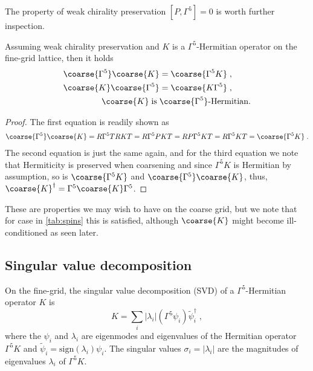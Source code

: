 The property of weak chirality preservation $[P, \Gamma^{5}]=0$ is worth further inspection.

\begin{lemma} \label{lemma:chirality:preservation:implications}
Assuming weak chirality preservation and $K$ is a $\Gamma^{5}$-Hermitian operator on the fine-grid lattice, then it holds
\begin{align}
\coarse{\Gamma^{5}} \coarse{K} &= \coarse{\Gamma^{5} K} \;, \\
\coarse{K} \coarse{\Gamma^{5}} &= \coarse{K \Gamma^{5}} \;, \\
\coarse{K} \; \text{is} \; &\coarse{\Gamma^{5}} \text{-Hermitian.}
\end{align}
\end{lemma}

\begin{proof}
The first equation is readily shown as
\begin{align}
\coarse{\Gamma^{5}} \coarse{K} = R \Gamma^{5} T R K T = R \Gamma^{5} P K T = R P \Gamma^{5} K T = R \Gamma^{5} K T = \coarse{\Gamma^{5} K} \;.
\end{align}
The second equation is just the same again, and for the third equation we note that Hermiticity is preserved when coarsening and since $\Gamma^{5} K$ is Hermitian by assumption, so is $\coarse{\Gamma^{5} K}$ and $\coarse{\Gamma^{5}} \coarse{K}$, thus, $\coarse{K}^{\dagger} = \Gamma^{5} \coarse{K} \Gamma^{5}$.
\end{proof}

These are properties we may wish to have on the coarse grid, but we note that for case  in \cref{tab:spins} this is satisfied, although $\coarse{K}$ might become ill-conditioned as seen later.

\subsection{Singular value decomposition}

On the fine-grid, the singular value decomposition (SVD) of a $\Gamma^{5}$-Hermitian operator $K$ is
\begin{equation} \label{eq:svd}
K = \sum_{i} \lvert \lambda_i \rvert (\Gamma^{5} \psi_i) \tilde{\psi}_i^{\dagger} \;,
\end{equation}
where the $\psi_i$ and $\lambda_i$ are eigenmodes and eigenvalues of the Hermitian operator $\Gamma^{5} K$ and $\tilde{\psi}_i = \text{sign}(\lambda_i) \psi_i$.
The singular values $\sigma_i = \lvert \lambda_i \rvert$ are the magnitudes of eigenvalues $\lambda_i$ of $\Gamma^{5} K$.

